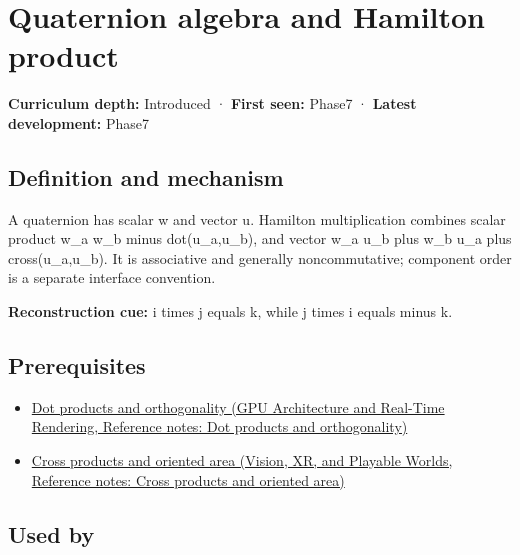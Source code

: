 \hypertarget{appendix-965d9260eeab}{}\label{referencestart:appendix-965d9260eeab}
\section{Quaternion algebra and Hamilton product}\label{appendix-965d9260eeab-quaternion-algebra-and-hamilton-product}

\textbf{Curriculum depth:} Introduced · \textbf{First seen:} Phase7 · \textbf{Latest development:} Phase7

\begin{allmightroledefinition}

\subsection{Definition and mechanism}\label{appendix-965d9260eeab-definition-and-mechanism}

A quaternion has scalar w and vector u. Hamilton multiplication combines scalar product w\_a w\_b minus dot(u\_a,u\_b), and vector w\_a u\_b plus w\_b u\_a plus cross(u\_a,u\_b). It is associative and generally noncommutative; component order is a separate interface convention.

\end{allmightroledefinition}

\textbf{Reconstruction cue:} i times j equals k, while j times i equals minus k.

\subsection{Prerequisites}\label{appendix-965d9260eeab-prerequisites}

\begin{itemize}
\tightlist
\item
  \href{../06-GPU-Architecture-and-Real-Time-Rendering/main.pdf\#nameddest=appendix-8bc4e8fc547c}{Dot products and orthogonality (GPU Architecture and Real-Time Rendering, Reference notes: Dot products and orthogonality)}
\item
  \href{../07-Vision-XR-and-Playable-Worlds/main.pdf\#nameddest=appendix-2391db8052b1}{Cross products and oriented area (Vision, XR, and Playable Worlds, Reference notes: Cross products and oriented area)}
\end{itemize}

\subsection{Used by}\label{appendix-965d9260eeab-used-by}

